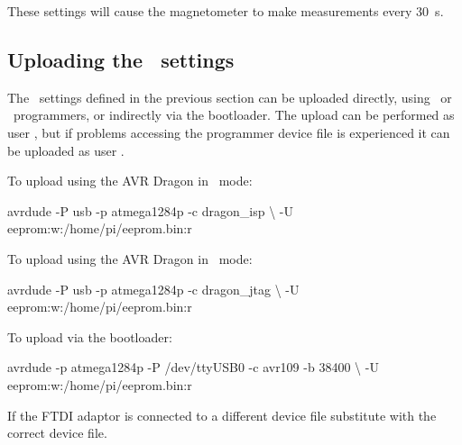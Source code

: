 These settings will cause the magnetometer to make measurements every
\SI{30}{\second}. 




\subsection[Uploading the EEPROM settings]{Uploading the \eeprom\
  settings}

The \eeprom\ settings defined in the previous section can be uploaded
directly, using \isp\ or \jtag\ programmers, or indirectly via the
\filename{xboot} bootloader. The upload can be performed as user
\piUser, but if problems accessing the programmer device file is
experienced it can be uploaded as user \rootUser.

To upload using the AVR Dragon in \isp\ mode:
\begin{Cmd}
avrdude -P usb -p atmega1284p -c dragon_isp \textbackslash
-U eeprom:w:/home/pi/eeprom.bin:r 
\end{Cmd}

To upload using the AVR Dragon in \jtag\ mode:
\begin{Cmd}
avrdude -P usb -p atmega1284p -c dragon_jtag \textbackslash
-U eeprom:w:/home/pi/eeprom.bin:r 
\end{Cmd}

To upload via the  bootloader:
\begin{Cmd}
avrdude -p atmega1284p -P /dev/ttyUSB0 -c avr109 -b 38400 \textbackslash
-U eeprom:w:/home/pi/eeprom.bin:r 
\end{Cmd}
If the FTDI adaptor is connected to a different device file substitute
\filename{/dev/ttyUSB0} with the correct device file.
